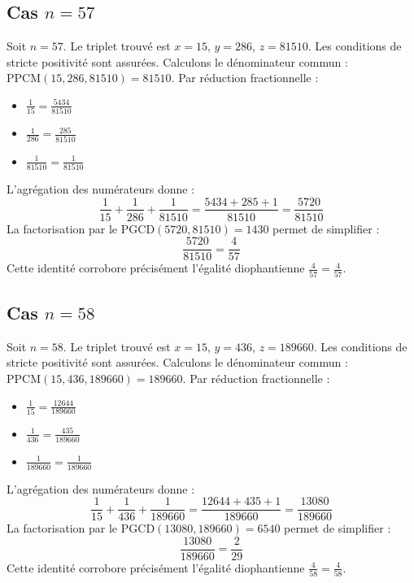 \documentclass[11pt,a4paper]{article}
\begin{document}
\subsection{Cas $n = 57$}
Soit $n = 57$. Le triplet trouvé est $x = 15$, $y = 286$, $z = 81510$.
Les conditions de stricte positivité sont assurées.
Calculons le dénominateur commun : $\text{PPCM}(15, 286, 81510) = 81510$.
Par réduction fractionnelle :
\begin{itemize}
    \item $\frac{1}{15} = \frac{5434}{81510}$
    \item $\frac{1}{286} = \frac{285}{81510}$
    \item $\frac{1}{81510} = \frac{1}{81510}$
\end{itemize}
L'agrégation des numérateurs donne :
$$ \frac{1}{15} + \frac{1}{286} + \frac{1}{81510} = \frac{5434 + 285 + 1}{81510} = \frac{5720}{81510} $$
La factorisation par le $\text{PGCD}(5720, 81510) = 1430$ permet de simplifier :
$$ \frac{5720}{81510} = \frac{4}{57} $$
Cette identité corrobore précisément l'égalité diophantienne $\frac{4}{57} = \frac{4}{57}$.

\subsection{Cas $n = 58$}
Soit $n = 58$. Le triplet trouvé est $x = 15$, $y = 436$, $z = 189660$.
Les conditions de stricte positivité sont assurées.
Calculons le dénominateur commun : $\text{PPCM}(15, 436, 189660) = 189660$.
Par réduction fractionnelle :
\begin{itemize}
    \item $\frac{1}{15} = \frac{12644}{189660}$
    \item $\frac{1}{436} = \frac{435}{189660}$
    \item $\frac{1}{189660} = \frac{1}{189660}$
\end{itemize}
L'agrégation des numérateurs donne :
$$ \frac{1}{15} + \frac{1}{436} + \frac{1}{189660} = \frac{12644 + 435 + 1}{189660} = \frac{13080}{189660} $$
La factorisation par le $\text{PGCD}(13080, 189660) = 6540$ permet de simplifier :
$$ \frac{13080}{189660} = \frac{2}{29} $$
Cette identité corrobore précisément l'égalité diophantienne $\frac{4}{58} = \frac{4}{58}$.
\end{document}
